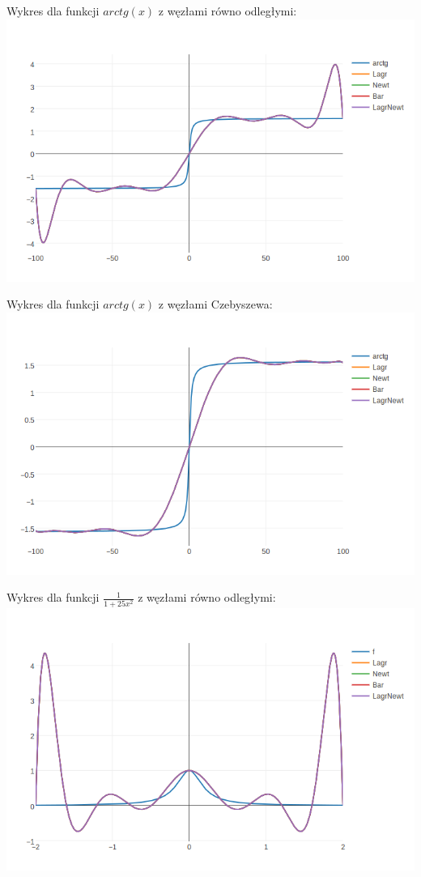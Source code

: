 \documentclass[11pt,wide]{article}
\begin{document}
\begin{center}
Wykres dla funkcji $arctg(x)$ z węzłami równo odległymi: \newline
\includegraphics[scale = 0.55]{arctg}

Wykres dla funkcji $arctg(x)$ z węzłami Czebyszewa: \newline
\includegraphics[scale = 0.55]{arctgch}

Wykres dla funkcji $\frac{1}{1 + 25x^2}$ z węzłami równo odległymi: \newline
\includegraphics[scale = 0.55]{runge}


\end{center}
\end{document}
